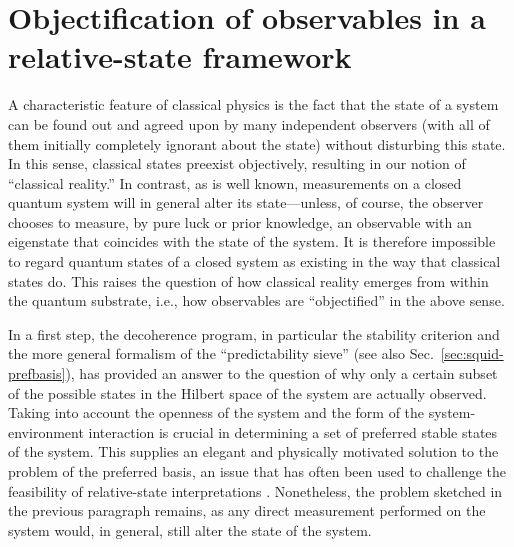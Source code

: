 \documentclass[12pt,aps,floatfix,amsmath,amssymb,showpacs,nofootinbib]{revtex4-2}
\begin{document}
\section{Objectification of observables in a relative-state framework}
\label{sec:object}

A characteristic feature of classical physics is the fact that the
state of a system can be found out and agreed upon by many independent
observers (with all of them initially completely ignorant about the
state) without disturbing this state. In this sense, classical states
preexist objectively, resulting in our notion of ``classical
reality.'' In contrast, as is well known, measurements on a closed
quantum system will in general alter its state---unless, of course,
the observer chooses to measure, by pure luck or prior knowledge, an
observable with an eigenstate that coincides with the state of the
system.  It is therefore impossible to regard quantum states of a
closed system as existing in the way that classical states do.  This raises
the question of how classical reality emerges from within the quantum
substrate, i.e., how observables are ``objectified'' in the above
sense.

In a first step, the decoherence program, in particular the stability
criterion and the more general formalism of the ``predictability
sieve''
\cite{Zurek:1981:dd,Zurek:1982:tv,Zurek:1993:pu,Zurek:1998:re,Zurek:2002:ii,%
  Schlosshauer:2003:tv} (see also Sec.~\ref{sec:squid-prefbasis}), has
provided an answer to the question of why only a certain subset of the
possible states in the Hilbert space of the system are actually
observed. Taking into account the openness of the system and the form
of the system-environment interaction is crucial in determining a set
of preferred stable states of the system. This supplies an elegant and
physically motivated solution to the problem of the preferred basis,
an issue that has often been used to challenge the feasibility of
relative-state interpretations \cite{Kent:1990:nm,Stapp:2002:pc}.
Nonetheless, the problem sketched in the previous paragraph remains,
as any direct measurement performed on the system would, in general,
still alter the state of the system.
\end{document}
